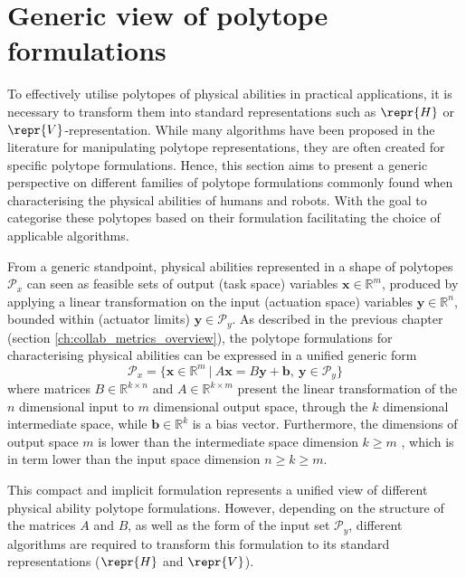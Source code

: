 \section{Generic view of polytope formulations}
\label{ch:generic_view}

To effectively utilise polytopes of physical abilities in practical applications, it is necessary to transform them into standard representations such as $\repr{H}$ or $\repr{V}$-representation. While many algorithms have been proposed in the literature for manipulating polytope representations, they are often created for specific polytope formulations. Hence, this section aims to present a generic perspective on different families of polytope formulations commonly found when characterising the physical abilities of humans and robots. With the goal to categorise these polytopes based on their formulation facilitating the choice of applicable algorithms.

From a generic standpoint, physical abilities represented in a shape of polytopes $\mathcal{P}_x$ can seen as feasible sets of output (task space) variables $\bm{x} \in \mathbb{R}^m$, produced by applying a linear transformation on the input (actuation space) variables $\bm{y} \in \mathbb{R}^n$, bounded within (actuator limits) $\bm{y}\in\mathcal{P}_y$. As described in the previous chapter (section \ref{ch:collab_metrics_overview}), the polytope formulations for characterising physical abilities can be expressed in a unified generic form 
\begin{equation}
    \mathcal{P}_x = \{\bm{x}\in\mathbb{R}^m ~|~ A\bm{x}=B\bm{y} + \bm{b}, ~ \bm{y}\in\mathcal{P}_y\}
    \label{eq:generic_polyt_view_revisit}
\end{equation}
where matrices $B\in\mathbb{R}^{k\times n}$ and $A\in\mathbb{R}^{k\times m}$ present the linear transformation of the $n$ dimensional input to $m$ dimensional output space, through the $k$ dimensional intermediate space, while $\bm{b}\in\mathbb{R}^k$ is a bias vector. Furthermore, the dimensions of output space $m$ is lower than the intermediate space dimension $k\!\geq\! m$ , which is in term lower than the input space dimension $n\!\geq\! k\!\geq\! m$. 

This compact and implicit formulation represents a unified view of different physical ability polytope formulations. However, depending on the structure of the matrices $A$ and $B$, as well as the form of the input set $\mathcal{P}_y$, different algorithms are required to transform this formulation to its standard representations ($\repr{H}$ and $\repr{V}$). 

